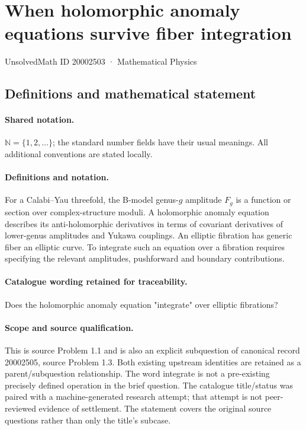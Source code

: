 \documentclass[11pt]{article}
\begin{document}
\setcounter{section}{20002502}
\section{When holomorphic anomaly equations survive fiber integration}\label{20002503}
{\small UnsolvedMath ID 20002503 · Mathematical Physics}
\subsection{Definitions and mathematical statement}

\paragraph{Shared notation.}$\mathbb N=\{1,2,\ldots\}$; the standard number fields have their usual meanings. All additional conventions are stated locally.


\paragraph{Definitions and notation.}For a Calabi--Yau threefold, the B-model genus-$g$ amplitude $F_g$ is a function or section over complex-structure moduli. A holomorphic anomaly equation describes its anti-holomorphic derivatives in terms of covariant derivatives of lower-genus amplitudes and Yukawa couplings. An elliptic fibration has generic fiber an elliptic curve. To integrate such an equation over a fibration requires specifying the relevant amplitudes, pushforward and boundary contributions.

\paragraph{Catalogue wording retained for traceability.}
Does the holomorphic anomaly equation "integrate" over elliptic fibrations?
\paragraph{Scope and source qualification.}This is source Problem 1.1 and is also an explicit subquestion of canonical record 20002505, source Problem 1.3. Both existing upstream identities are retained as a parent/subquestion relationship. The word integrate is not a pre-existing precisely defined operation in the brief question. The catalogue title/status was paired with a machine-generated research attempt; that attempt is not peer-reviewed evidence of settlement. The statement covers the original source questions rather than only the title’s subcase.
\end{document}
